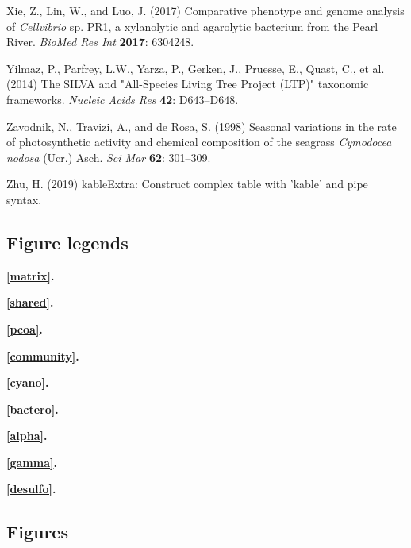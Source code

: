 \documentclass[12pt,]{article}
\begin{document}
\leavevmode\hypertarget{ref-Xie2017}{}%
Xie, Z., Lin, W., and Luo, J. (2017) Comparative phenotype and genome
analysis of \emph{Cellvibrio} sp. PR1, a xylanolytic and agarolytic
bacterium from the Pearl River. \emph{BioMed Res Int} \textbf{2017}:
6304248.

\leavevmode\hypertarget{ref-Yilmaz2014}{}%
Yilmaz, P., Parfrey, L.W., Yarza, P., Gerken, J., Pruesse, E., Quast,
C., et al. (2014) The SILVA and "All-Species Living Tree Project (LTP)"
taxonomic frameworks. \emph{Nucleic Acids Res} \textbf{42}: D643--D648.

\leavevmode\hypertarget{ref-Zavodnik1998}{}%
Zavodnik, N., Travizi, A., and de Rosa, S. (1998) Seasonal variations in
the rate of photosynthetic activity and chemical composition of the
seagrass \emph{Cymodocea nodosa} (Ucr.) Asch. \emph{Sci Mar}
\textbf{62}: 301--309.

\leavevmode\hypertarget{ref-Zhu2019}{}%
Zhu, H. (2019) kableExtra: Construct complex table with 'kable' and pipe
syntax.

\newpage 
\setlength\parindent{0pt}

\hypertarget{figure-legends}{%
\subsection{Figure legends}\label{figure-legends}}

\textbf{\autoref{matrix}.} 

\textbf{\autoref{shared}.} 

\textbf{\autoref{pcoa}.} 

\textbf{\autoref{community}.} 

\textbf{\autoref{cyano}.} 

\textbf{\autoref{bactero}.} 

\textbf{\autoref{alpha}.} 

\textbf{\autoref{gamma}.} 

\textbf{\autoref{desulfo}.} 

\hypertarget{figures}{%
\subsection{Figures}\label{figures}}
\end{document}
